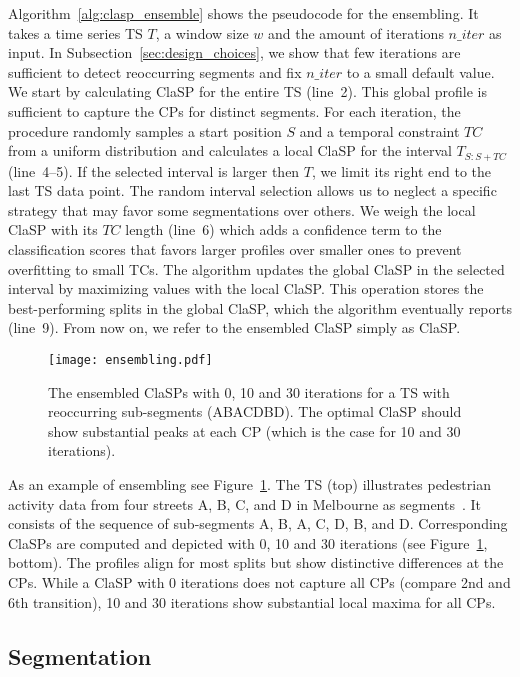 \documentclass[pdflatex,sn-basic]{sn-jnl}
\begin{document}
Algorithm~\ref{alg:clasp_ensemble} shows the pseudocode for the ensembling. It takes a time series TS $T$, a window size $w$ and the amount of iterations $n\_iter$ as input.  In Subsection~\ref{sec:design_choices}, we show that few iterations are sufficient to detect reoccurring segments and fix $n\_iter$ to a small default value. We start by calculating ClaSP for the entire TS (line~2). This global profile is sufficient to capture the CPs for distinct segments. For each iteration, the procedure randomly samples a start position $S$ and a temporal constraint $TC$ from a uniform distribution and calculates a local ClaSP for the interval $T_{S:S+TC}$ (line~4--5). If the selected interval is larger then $T$, we limit its right end to the last TS data point. The random interval selection allows us to neglect a specific strategy that may favor some segmentations over others. We weigh the local ClaSP with its $TC$ length (line~6) which adds a confidence term to the classification scores that favors larger profiles over smaller ones to prevent overfitting to small TCs. The algorithm updates the global ClaSP in the selected interval by maximizing values with the local ClaSP. This operation stores the best-performing splits in the global ClaSP, which the algorithm eventually reports (line~9). From now on, we refer to the ensembled ClaSP simply as ClaSP.

\begin{figure}[t]
	\texttt{[image: ensembling.pdf]}
	\caption{The ensembled ClaSPs with 0, 10 and 30 iterations for a TS with reoccurring sub-segments (ABACDBD). The optimal ClaSP should show substantial peaks at each CP (which is the case for 10 and 30 iterations). \label{fig:ClaSP_ensembling}
	}
\end{figure}

As an example of ensembling see Figure~\ref{fig:ClaSP_ensembling}. The TS (top) illustrates pedestrian activity data from four streets A, B, C, and D in Melbourne as segments~\citep{UCRClassification}. It consists of the sequence of sub-segments A, B, A, C, D, B, and D. Corresponding ClaSPs are computed and depicted with 0, 10 and 30 iterations (see Figure~\ref{fig:ClaSP_ensembling}, bottom). The profiles align for most splits but show distinctive differences at the CPs. While a ClaSP with 0 iterations does not capture all CPs (compare 2nd and 6th transition), 10 and 30 iterations show substantial local maxima for all CPs.


\subsection{Segmentation}\label{sec:segmentation_alg}
\end{document}
